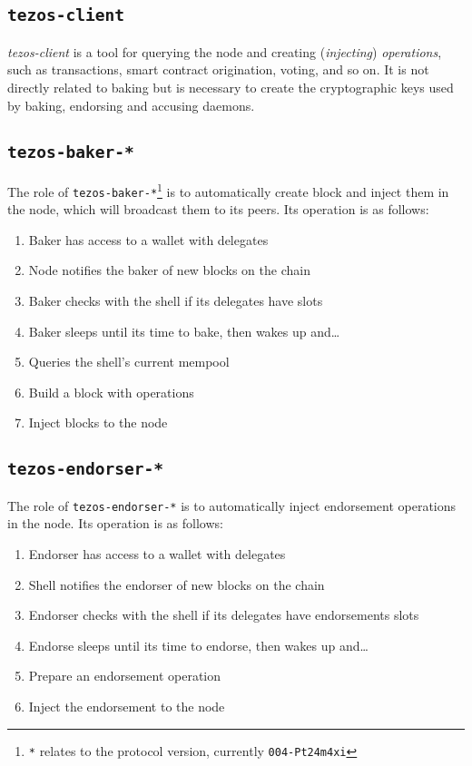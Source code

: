\documentclass[a4paper,twocolumn,10pt]{article}
\begin{document}
\subsection{\texttt{tezos-client}}

\emph{tezos-client} is a tool for querying the node and creating
(\emph{injecting}) \emph{operations}, such as transactions, smart
contract origination, voting, and so on. It is not directly related to
baking but is necessary to create the cryptographic keys used by
baking, endorsing and accusing daemons.

\subsection{\texttt{tezos-baker-*}}

The role of \texttt{tezos-baker-*}\footnote{\texttt{*} relates to the
  protocol version, currently \texttt{004-Pt24m4xi}} is to
automatically create block and inject them in the node, which will
broadcast them to its peers. Its operation is as follows:

\begin{footnotesize}
\begin{enumerate}
\item Baker has access to a wallet with delegates
\item Node notifies the baker of new blocks on the chain
\item Baker checks with the shell if its delegates have slots
\item Baker sleeps until its time to bake, then wakes up and…
\item Queries the shell’s current mempool
\item Build a block with operations
\item Inject blocks to the node
\end{enumerate}
\end{footnotesize}

\subsection{\texttt{tezos-endorser-*}}

The role of \texttt{tezos-endorser-*} is to automatically inject
endorsement operations in the node. Its operation is as follows:

\begin{footnotesize}
\begin{enumerate}
\item Endorser has access to a wallet with delegates
\item Shell notifies the endorser of new blocks on the chain
\item Endorser checks with the shell if its delegates have endorsements slots
\item Endorse sleeps until its time to endorse, then wakes up and…
\item Prepare an endorsement operation
\item Inject the endorsement to the node
\end{enumerate}
\end{footnotesize}
\end{document}

